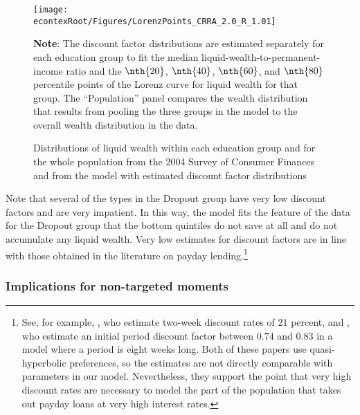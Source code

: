 \documentclass[\econtexRoot/HAFiscal]{subfiles}
\begin{document}
\begin{figure}[th]
  \begin{center}
    \texttt{[image: \\econtexRoot/Figures/LorenzPoints\_CRRA\_2.0\_R\_1.01]}
    \caption{Distributions of liquid wealth within each education group and for the whole population from the 2004 Survey of Consumer Finances and from the model with estimated discount factor distributions}
    \notinsubfile{\label{fig:LorenzPts}}
    \parbox{16cm}{\small \vspace{.15cm} \textbf{Note}: The discount factor distributions are estimated separately for each education group to fit the median liquid-wealth-to-permanent-income ratio and the $\nth{20}$, $\nth{40}$, $\nth{60}$, and $\nth{80}$ percentile points of the Lorenz curve for liquid wealth for that group. The ``Population'' panel compares the wealth distribution that results from pooling the three groups in the model to the overall wealth distribution in the data.\normalsize}
  \end{center}
\end{figure}

Note that several of the types in the Dropout group have very low discount factors and are very impatient.
In this way, the model fits the feature of the data for the Dropout group that the bottom quintiles do not save at all and do not accumulate any liquid wealth.
Very low estimates for discount factors are in line with those obtained in the literature on payday lending.\footnote{See, for example, \cite{skiba2008payday}, who estimate two-week discount rates of $21$ percent, and \cite{allcott2021high}, who estimate an initial period discount factor between $0.74$ and $0.83$ in a model where a period is eight weeks long.
Both of these papers use quasi-hyperbolic preferences, so the estimates are not directly comparable with parameters in our model.
Nevertheless, they support the point that very high discount rates are necessary to model the part of the population that takes out payday loans at very high interest rates.} 

\hypertarget{non-targeted-moments}{}\par\subsubsection{Implications for non-targeted moments} 
\notinsubfile{\label{sec:nonTargetedMoments}}
\end{document}
